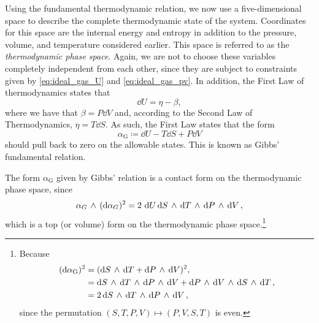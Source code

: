 Using the fundamental thermodynamic relation, we now use a five-dimensional space to describe the complete thermodynamic state of the system. Coordinates for this space are the internal energy and entropy in addition to the pressure, volume, and temperature considered earlier. This space is referred to as the \emph{thermodynamic phase space}. Again, we are not to choose these variables completely independent from each other, since they are subject to constraints given by \cref{eq:ideal_gas_U} and \cref{eq:ideal_gas_pv}. In addition, the First Law of thermodynamics states that
$$ \dd{U} = \eta - \beta, $$
where we have that $ \beta = P\dd{V} $ and, according to the Second Law of Thermodynamics, $\eta = T\dd{S}$. As such, the First Law states that the form
\begin{equation} 
    \alpha_\text{G} \coloneq \dd{U} - T\dd{S} + P\dd{V}
    \label{eq:gibbs_relation}
\end{equation}
should pull back to zero on the allowable states. This is known as Gibbs' fundamental relation. 

The form $\alpha_\text{G}$ given by Gibbs' relation is a contact form on the thermodynamic phase space, since
$$  \alpha_G\,\wedge\,(\dd{\alpha_G})^2  = 2\,\dd{U}  \dd{S}\,\wedge\,\dd{T} \,\wedge\, \dd{P}\,\wedge\,\dd{V}  , $$
which is a top (or volume) form on the thermodynamic phase space.\footnote
{
    Because 
    \begin{equation*} 
        \begin{split}
            (\dd{\alpha_\text{G}})^2 &= ( \dd{S}\,\wedge\,\dd{T}  +  \dd{P}\,\wedge\,\dd{V} )^2, \\
                            &=   \dd{S}\,\wedge\,\dd{T} \,\wedge\, \dd{P}\,\wedge\,\dd{V}   +   \dd{P}\,\wedge\,\dd{V} \,\wedge\, \dd{S}\,\wedge\,\dd{T}  , \\
                            &= 2  \dd{S}\,\wedge\,\dd{T} \,\wedge\, \dd{P}\,\wedge\,\dd{V}  , \\
        \end{split}
    \end{equation*}
    since the permutation $ (S, T, P, V) \mapsto (P, V, S, T) $ is even.
}


